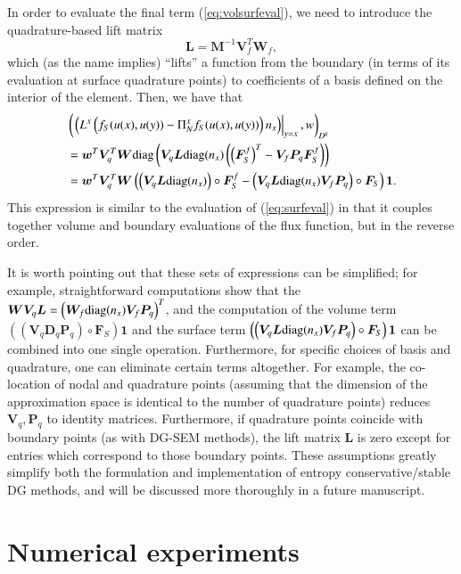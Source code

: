 \documentclass[preprint,10pt]{elsarticle}
\theoremstyle{definition}
\theoremstyle{lemma}
\theoremstyle{theorem}
\theoremstyle{assumption}
\newcommand{\LRp}[1]{\left( #1 \right)}
\begin{document}
In order to evaluate the final term (\ref{eq:volsurfeval}), we need to introduce the quadrature-based lift matrix 
\[
\bm{L} = \bm{M}^{-1}\bm{V}_f^T \bm{W}_f,
\]
which (as the name implies) ``lifts'' a function from the boundary (in terms of its evaluation at surface quadrature points) to coefficients of a basis defined on the interior of the element.  Then, we have that
\begin{align*}
&\LRp{\left.\LRp{L^x\LRp{{f}_S({u}(x),{u}(y)) - \Pi_N^x{f}_S({u}(x),{u}(y))}{n}_x}\right|_{y=x},{w}}_{D^k} \\
&= \bm{w}^T\bm{V}_q^T\bm{W}{\rm diag}\LRp{\bm{V}_q\bm{L}{\rm diag}({n}_x) \LRp{\LRp{\bm{F}_S^f}^T - \bm{V}_f\bm{P}_q \bm{F}_S^f}}\\
&= \bm{w}^T\bm{V}_q^T\bm{W}\LRp{ \LRp{\bm{V}_q\bm{L}{\rm diag}({n}_x)} \circ {\bm{F}_S^f} - \LRp{\bm{V}_q\bm{L}{\rm diag}({n}_x)\bm{V}_f\bm{P}_q}\circ {\bm{F}_S}}\bm{1}.
\end{align*}
This expression is similar to the evaluation of (\ref{eq:surfeval}) in that it couples together volume and boundary evaluations of the flux function, but in the reverse order.  


It is worth pointing out that these sets of expressions can be simplified; for example, straightforward computations show that the $\bm{W}\bm{V}_q\bm{L} = \LRp{\bm{W}_f{\rm diag}({n}_x)\bm{V}_f\bm{P}_q}^T$, and the computation of the volume term $\LRp{\LRp{\bm{V}_q \bm{D}_q \bm{P}_q} \circ \bm{F}_S}\bm{1}$ and the surface term $\LRp{\LRp{\bm{V}_q\bm{L}{\rm diag}({n}_x)\bm{V}_f\bm{P}_q}\circ {\bm{F}_S}}\bm{1}$ can be combined into one single operation.  Furthermore, for specific choices of basis and quadrature, one can eliminate certain terms altogether.  For example, the co-location of nodal and quadrature points (assuming that the dimension of the approximation space is identical to the number of quadrature points) reduces $\bm{V}_q, \bm{P}_q$ to identity matrices.  Furthermore, if quadrature points coincide with boundary points (as with DG-SEM methods), the lift matrix $\bm{L}$ is zero except for entries which correspond to those boundary points.  These assumptions greatly simplify both the formulation and implementation of entropy conservative/stable DG methods, and will be discussed more thoroughly in a future manuscript.  


\section{Numerical experiments}
\label{sec:num}
\end{document}
